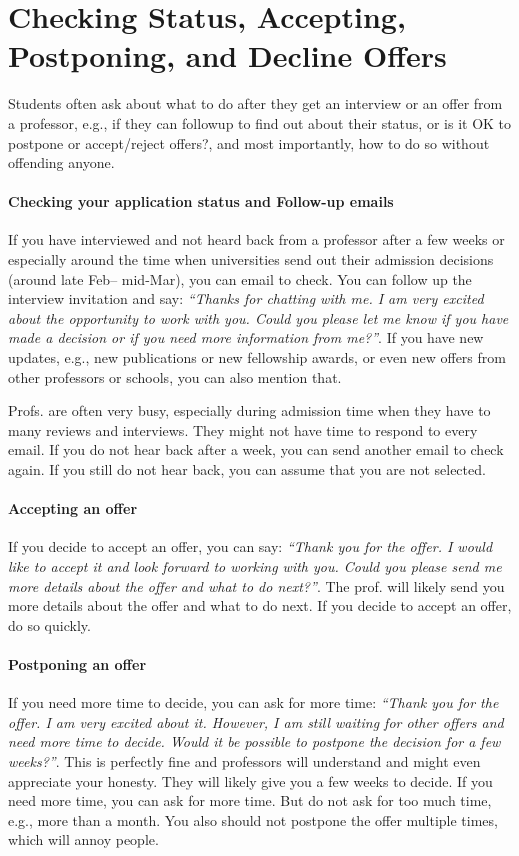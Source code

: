 \documentclass[oneside,11pt,dvipsnames]{book}
\begin{document}
\section{Checking Status, Accepting, Postponing, and Decline Offers}\label{sec:accept-postpone-decline}

Students often ask about what to do after they get an interview or an offer from a professor, e.g., if they can followup to find out about their status, or is it OK to postpone or accept/reject offers?, and most importantly, how to do so without offending anyone. 

\paragraph{Checking your application status and Follow-up emails} If you have interviewed and not heard back from a professor after a few weeks or especially around the time when universities send out their admission decisions (around late Feb-- mid-Mar), you can email to check.  You can follow up the interview invitation and say: \emph{``Thanks for chatting with me. I am very excited about the opportunity to work with you.  Could you please let me know if you have made a decision or if you need more information from me?''}.  If you have new updates, e.g., new publications or new fellowship awards, or even new offers from other professors or schools, you can also mention that.

Profs. are often very busy, especially during admission time when they have to many reviews and interviews.  They might not have time to respond to every email.  If you do not hear back after a week, you can send another email to check again.  If you still do not hear back, you can assume that you are not selected.

\paragraph{Accepting an offer} If you decide to accept an offer, you can say: \emph{``Thank you for the offer.  I would like to accept it and look forward to working with you.  Could you please send me more details about the offer and what to do next?''}. The prof. will likely send you more details about the offer and what to do next.  If you decide to accept an offer, do so quickly.



\paragraph{Postponing an offer} If you need more time to decide, you can ask for more time: \emph{``Thank you for the offer.  I am very excited about it.  However, I am still waiting for other offers and need more time to decide.  Would it be possible to postpone the decision for a few weeks?''}.  This is perfectly fine and professors will understand and might even appreciate your honesty.  They will likely give you a few weeks to decide.  If you need more time, you can ask for more time.  But do not ask for too much time, e.g., more than a month.  You also should not postpone the offer multiple times, which will annoy people.
\end{document}
